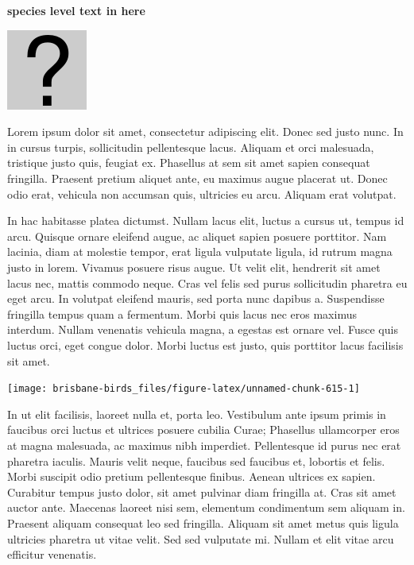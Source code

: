 \documentclass[]{book}
\let\origfigure\figure
\let\endorigfigure\endfigure
\renewenvironment{figure}[1][2] {
  \expandafter\origfigure\expandafter[H]
} {
  \endorigfigure
}
\begin{document}
\textbf{species level text in here}

\begin{figure}
\centering
\includegraphics{assets/missing.png}
\caption{No image for species}
\end{figure}

Lorem ipsum dolor sit amet, consectetur adipiscing elit. Donec sed justo
nunc. In in cursus turpis, sollicitudin pellentesque lacus. Aliquam et
orci malesuada, tristique justo quis, feugiat ex. Phasellus at sem sit
amet sapien consequat fringilla. Praesent pretium aliquet ante, eu
maximus augue placerat ut. Donec odio erat, vehicula non accumsan quis,
ultricies eu arcu. Aliquam erat volutpat.

In hac habitasse platea dictumst. Nullam lacus elit, luctus a cursus ut,
tempus id arcu. Quisque ornare eleifend augue, ac aliquet sapien posuere
porttitor. Nam lacinia, diam at molestie tempor, erat ligula vulputate
ligula, id rutrum magna justo in lorem. Vivamus posuere risus augue. Ut
velit elit, hendrerit sit amet lacus nec, mattis commodo neque. Cras vel
felis sed purus sollicitudin pharetra eu eget arcu. In volutpat eleifend
mauris, sed porta nunc dapibus a. Suspendisse fringilla tempus quam a
fermentum. Morbi quis lacus nec eros maximus interdum. Nullam venenatis
vehicula magna, a egestas est ornare vel. Fusce quis luctus orci, eget
congue dolor. Morbi luctus est justo, quis porttitor lacus facilisis sit
amet.

\begin{figure}
\texttt{[image: brisbane-birds\_files/figure-latex/unnamed-chunk-615-1]} \caption{insert figure caption}\label{fig:unnamed-chunk-615}
\end{figure}

In ut elit facilisis, laoreet nulla et, porta leo. Vestibulum ante ipsum
primis in faucibus orci luctus et ultrices posuere cubilia Curae;
Phasellus ullamcorper eros at magna malesuada, ac maximus nibh
imperdiet. Pellentesque id purus nec erat pharetra iaculis. Mauris velit
neque, faucibus sed faucibus et, lobortis et felis. Morbi suscipit odio
pretium pellentesque finibus. Aenean ultrices ex sapien. Curabitur
tempus justo dolor, sit amet pulvinar diam fringilla at. Cras sit amet
auctor ante. Maecenas laoreet nisi sem, elementum condimentum sem
aliquam in. Praesent aliquam consequat leo sed fringilla. Aliquam sit
amet metus quis ligula ultricies pharetra ut vitae velit. Sed sed
vulputate mi. Nullam et elit vitae arcu efficitur venenatis.
\end{document}
